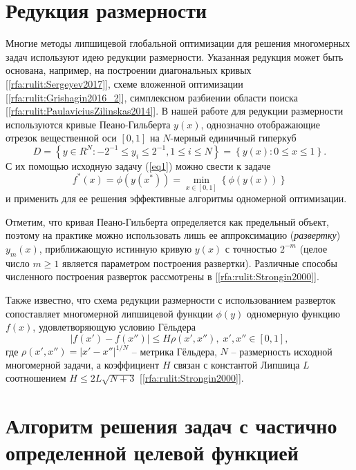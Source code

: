 \documentclass[10pt,a4paper]{book}
\begin{document}
\section{Редукция размерности}\label{sec:reduction}

Многие методы липшицевой глобальной оптимизации для решения многомерных задач используют идею редукции размерности. Указанная редукция может быть основана, например, на построении диагональных кривых [\ref{rfa:rulit:Sergeyev2017}], схеме вложенной оптимизации [\ref{rfa:rulit:Grishagin2016_2}], симплексном разбиении области поиска [\ref{rfa:rulit:PaulaviciusZilinskas2014}].
В нашей работе для редукции размерности используются кривые Пеано-Гильберта $y(x)$, однозначно отображающие отрезок вещественной оси  $[0,1]$ на $N$-мерный единичный гиперкуб
\begin{equation}\label{eq2_} 
D=\left\{ y \in R^N: -2^{-1} \leq y_i \leq 2^{-1}, 1 \leq i \leq N \right\} = \left\{ y(x): 0 \leq x \leq 1 \right\}.
\end{equation}
С их помощью исходную задачу (\ref{eq1}) можно свести к задаче 
\begin{equation}\label{eq2} 
f^*(x)=\phi(y(x^* ))=\min_{x \in [0,1]} \left\{ \phi(y(x)) \right\}
\end{equation}
и применить для ее решения эффективные алгоритмы одномерной оптимизации. 

Отметим, что кривая Пеано-Гильберта определяется как предельный объект, поэтому на практике можно использовать лишь ее аппроксимацию (\textit{развертку}) $y_m(x)$, приближающую истинную кривую $y(x)$ с точностью $2^{-m}$ (целое число $m \geq 1$ является параметром построения развертки). Различные способы численного построения разверток рассмотрены в [\ref{rfa:rulit:Strongin2000}].

Также известно, что схема редукции размерности с использованием разверток сопоставляет многомерной липшицевой функции $\phi(y)$ одномерную функцию $f(x)$, удовлетворяющую условию Гёльдера
\begin{equation}\label{eq4} 
| f(x')-f(x'') | \leq H \rho(x',x''), \; x',x'' \in [0,1],
\end{equation}
где $\rho(x',x'') =  |x' - x''|^{1/N}$ -- метрика Гёльдера, $N$ -- размерность исходной многомерной задачи, а коэффициент $H$ связан с константой Липшица $L$ соотношением $H \leq 2L\sqrt {N+3}$ [\ref{rfa:rulit:Strongin2000}].


\section{Алгоритм решения задач с частично определенной целевой функцией}\label{sec:algorithm}
\end{document}
